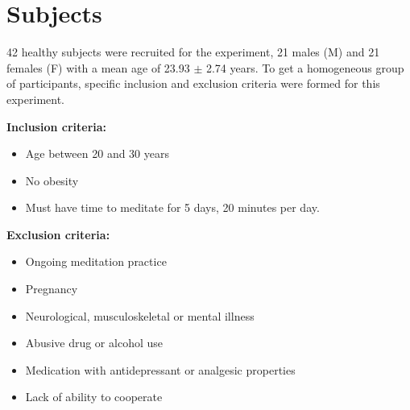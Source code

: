 

\section{Subjects}
42 healthy subjects were recruited for the experiment, 21 males (M) and 21 females (F) with a mean age of 23.93 $\pm$ 2.74 years. To get a homogeneous group of participants, specific inclusion and exclusion criteria were  formed for this experiment.

\textbf{Inclusion criteria:}
\vspace{-.5cm}
\begin{itemize}
	\vspace{-.3cm}
	\item Age between 20 and 30 years
	\vspace{-.3cm}
	\item No obesity
	\vspace{-.3cm}
	\item Must have time to meditate for 5 days, 20 minutes per day.
\end{itemize}

\textbf{Exclusion criteria:}
\vspace{-.5cm}
\begin{itemize}
	\item Ongoing meditation practice 
	\vspace{-.3cm}
	\item Pregnancy 
	\vspace{-.3cm}
	\item Neurological, musculoskeletal or mental illness
	\vspace{-.3cm}
	\item Abusive drug or alcohol use 
		\vspace{-.3cm}
			\item Medication with antidepressant or analgesic properties
\vspace{-.3cm}
	\item Lack of ability to cooperate
\end{itemize}

